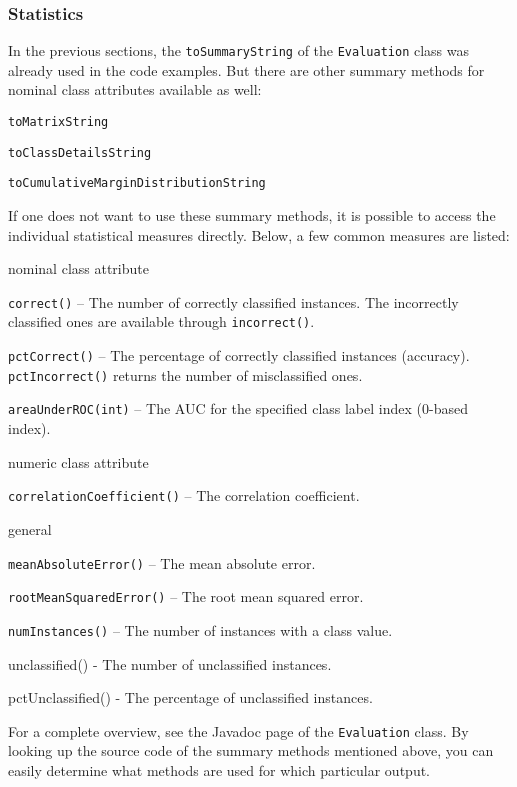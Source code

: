 \subsubsection*{Statistics}
In the previous sections, the \texttt{toSummaryString} of the
\texttt{Evaluation} class was already used in the code examples. But there are
other summary methods for nominal class attributes available as well:
\begin{tight_itemize}
	\item \texttt{toMatrixString}
	\item \texttt{toClassDetailsString}
	\item \texttt{toCumulativeMarginDistributionString}
\end{tight_itemize}
If one does not want to use these summary methods, it is possible to access the
individual statistical measures directly. Below, a few common measures
are listed:
\begin{tight_itemize}
	\item nominal class attribute
	\begin{tight_itemize}
		\item \texttt{correct()} -- The number of correctly classified
instances. The incorrectly classified ones are available through
\texttt{incorrect()}.
		\item \texttt{pctCorrect()} -- The percentage of correctly classified
instances (accuracy). \texttt{pctIncorrect()} returns the number of
misclassified ones.
		\item \texttt{areaUnderROC(int)} -- The AUC for the specified class
label index (0-based index).
	\end{tight_itemize}

	\item numeric class attribute
	\begin{tight_itemize}
		\item \texttt{correlationCoefficient()} -- The correlation coefficient.
	\end{tight_itemize}

	\item general
	\begin{tight_itemize}
		\item \texttt{meanAbsoluteError()} -- The mean absolute error.
		\item \texttt{rootMeanSquaredError()} -- The root mean squared error.
		\item \texttt{numInstances()} -- The number of instances with a class
value.
		\item unclassified() - The number of unclassified instances.
		\item pctUnclassified() - The percentage of unclassified instances.
	\end{tight_itemize}
\end{tight_itemize}
For a complete overview, see the Javadoc page of the \texttt{Evaluation} class.
By looking up the source code of the summary methods mentioned above, you can
easily determine what methods are used for which particular output.


